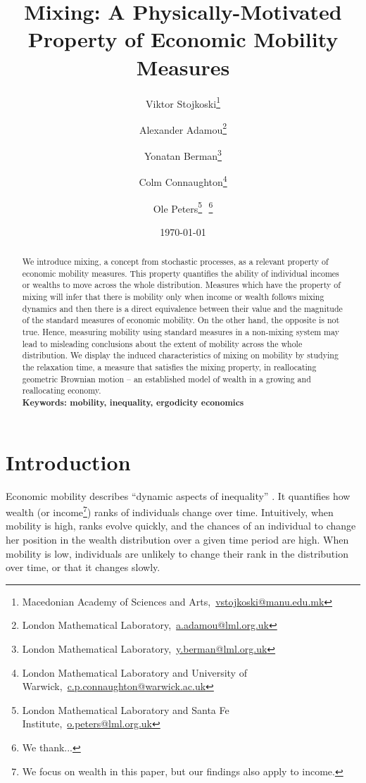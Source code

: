 \documentclass[11pt]{article}
\newcommand{\bc}{\begin{center}}
\newcommand{\ec}{\end{center}}
\newcommand{\red}[1]{{\color{red} #1}}
\numberwithin{equation}{section}
\begin{document}
\begin{titlepage}
\title{Mixing: A Physically-Motivated Property of Economic Mobility Measures}
\author{Viktor Stojkoski\footnote{Macedonian Academy of Sciences and Arts,~\url{vstojkoski@manu.edu.mk}} \and Alexander Adamou\footnote{London Mathematical Laboratory,~\url{a.adamou@lml.org.uk}} \and Yonatan Berman\footnote{London Mathematical Laboratory,~\url{y.berman@lml.org.uk}} \and Colm Connaughton\footnote{London Mathematical Laboratory and University of Warwick,~\url{c.p.connaughton@warwick.ac.uk}} \and Ole Peters\footnote{London Mathematical Laboratory and Santa Fe Institute,~\url{o.peters@lml.org.uk}}\,\, \thanks{We thank...}}
\date{\today}
\maketitle
\begin{abstract}
We introduce mixing, a concept from stochastic processes, as a relevant property of economic mobility measures. This property quantifies the ability of individual incomes or wealths to move across the whole distribution. Measures which have the property of mixing will infer that there is mobility only when income or wealth follows mixing dynamics and then there is a direct equivalence between their value and the magnitude of the standard measures of economic mobility. On the other hand, the opposite is not true. Hence, measuring mobility using standard measures in a non-mixing system may lead to misleading conclusions about the extent of mobility across the whole distribution. We display the induced characteristics of mixing on mobility by studying the relaxation time, a measure that satisfies the mixing property, in reallocating geometric Brownian motion -- an established model of wealth in a growing and reallocating economy.
\\

\noindent\textbf{Keywords: mobility, inequality, ergodicity economics}
\end{abstract}
\setcounter{page}{0}
\thispagestyle{empty}
\end{titlepage}
\pagebreak \newpage
\section{Introduction}\label{sec:introduction}
Economic mobility describes ``dynamic aspects of inequality'' \citep{Shorrocks1978}. It quantifies how wealth (or income\footnote{We focus on wealth in this paper, but our findings also apply to income.}) ranks of individuals change over time. Intuitively, when mobility is high, ranks evolve quickly, and the chances of an individual to change her position in the wealth distribution over a given time period are high. When mobility is low, individuals are unlikely to change their rank in the distribution over time, or that it changes slowly.
\end{document}
